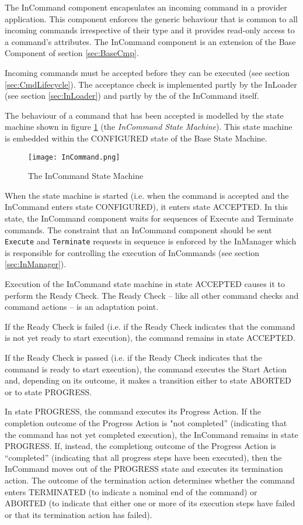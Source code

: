 The InCommand component encapsulates an incoming command in a provider application. This component enforces the generic behaviour that is common to all incoming commands irrespective of their type and it provides read-only access to a command's attributes. The InCommand component is an extension of the Base Component of section \ref{sec:BaseCmp}. 

Incoming commands must be accepted before they can be executed (see section \ref{sec:CmdLifecycle}). The acceptance check is implemented partly by the InLoader (see section \ref{sec:InLoader}) and partly by the  of the InCommand itself.

The behaviour of a command that has been accepted is modelled by the state machine shown in figure \ref{fig:InCommand} (the \textit{InCommand State Machine}). This state machine is embedded within the CONFIGURED state of the Base State Machine. 

\begin{figure}[h]
 \centering
 \texttt{[image: InCommand.png]}
 \caption{The InCommand State Machine}
 \label{fig:InCommand}
\end{figure}

When the state machine is started (i.e. when the command is accepted and the InCommand enters state CONFIGURED), it enters state ACCEPTED. In this state, the InCommand component waits for sequences of Execute and Terminate commands. The constraint that an InCommand component should be sent \texttt{Execute} and \texttt{Terminate} requests in sequence is enforced by the InManager which is responsible for controlling the execution of InCommands (see section \ref{sec:InManager}).

Execution of the InCommand state machine in state ACCEPTED causes it to perform the Ready Check. The Ready Check – like all other command checks and command actions – is an adaptation point.  

If the Ready Check is failed (i.e. if the Ready Check indicates that the command is not yet ready to start execution), the command remains in state ACCEPTED.

If the Ready Check is passed (i.e. if the Ready Check indicates that the command is ready to start execution), the command executes the Start Action and, depending on its outcome, it makes a transition either to state ABORTED or to state PROGRESS.  

In state PROGRESS, the command executes its Progress Action. If the completion outcome of the Progress Action is "not completed” (indicating that the command has not yet completed execution), the InCommand remains in state PROGRESS. If, instead, the completiong outcome of the Progress Action is “completed” (indicating that all progress steps have been executed), then the InCommand moves out of the PROGRESS state and executes its termination action. The outcome of the termination action determines whether the command enters TERMINATED (to indicate a nominal end of the command) or ABORTED (to indicate that either one or more of its execution steps have failed or that its termination action has failed).  

